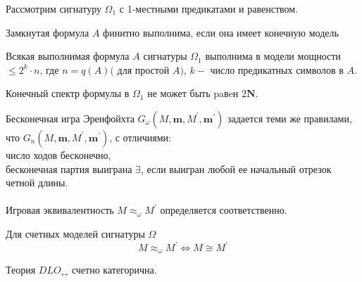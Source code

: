 Рассмотрим сигнатуру $\Omega_{1}$ с 1-местными предикатами и равенством.
\begin{defn}
Замкнутая формула $A$ финитно выполнима, если она имеет конечную модель
\end{defn}
\begin{theo}[Лёвенгейм, 1915]
Всякая выполнимая формула $A$ сигнатуры $\Omega_{1}$ выполнима в модели мощности $\leq 2^{k} \cdot n$, где $n=q(A)($ для простой $A)$, $k-$ число предикатных символов в $A .$
\end{theo}
\begin{corol}
Конечный спектр формулы в $\Omega_{1}$ не может быть paвeн $2 \mathbf{N}$.
\end{corol}
\begin{defn}
Бесконечная игра Эренфойхта $G_{\omega}\left(M, \mathbf{m}, M^{\prime}, \mathbf{m}^{\prime}\right)$ задается теми же правилами, что $G_{n}\left(M, \mathbf{m}, M^{\prime}, \mathbf{m}^{\prime}\right)$, с отличиями:\\
число ходов бесконечно, 
\\
бесконечная партия выиграна $\exists$, если выигран любой ее начальный отрезок четной длины.\\
\\
Игровая эквивалентность $M \approx_{\omega} M^{\prime}$ определяется соответственно.
\end{defn}
\begin{theo}
Для счетных моделей сигнатуры $\Omega$
$$
M \approx_{\omega} M^{\prime} \Leftrightarrow M \cong M^{\prime}
$$
\end{theo}
\begin{theo}[Кантор]
Теория $D L O_{\leftrightarrow}$ счетно категорична.
\end{theo}